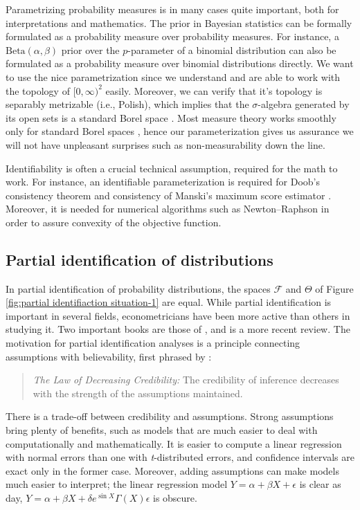 Parametrizing probability measures is in many cases quite important, both for interpretations and mathematics. The prior in Bayesian statistics can be formally formulated as a probability measure over probability measures. For instance, a $\textrm{Beta}(\alpha,\beta)$ prior over the $p$-parameter of a binomial distribution can also be formulated as a probability measure over binomial distributions directly. We want to use the nice parametrization since we understand and are able to work with the topology of $[0,\infty)^2$ easily. Moreover, we can verify that it's topology is separably metrizable (i.e., Polish), which implies that the $\sigma$-algebra generated by its open sets is a standard Borel space \parencite{Kechris2012-nh}. Most measure theory works smoothly only for standard Borel spaces \parencite[][Chapter 1]{Van_der_Vaart1996-dx}, hence our parameterization gives us assurance we will not have unpleasant surprises such as non-measurability down the line. 

Identifiability is often a crucial technical assumption, required for the math to work. For instance, an identifiable parameterization is required for Doob's consistency theorem \parencite{Miller2018-xq} and consistency of Manski's maximum score estimator \parencite{Manski1975-gl}. Moreover, it is needed for numerical algorithms such as Newton--Raphson in order to assure convexity of the objective function.

\subsection{Partial identification of distributions}
In partial identification of probability distributions, the spaces $\mathcal{F}$ and $\Theta$ of Figure \ref{fig:partial identifiaction situation-1} are equal. While partial identification is important in several fields, econometricians have been more active than others in studying it. Two important books are those of \textcite{Manski1999-ab,Manski2003-aq}, and \textcite{Tamer2010-rj} is a more recent review. The motivation for partial identification analyses is a principle connecting assumptions with believability, first phrased by \textcite[p. 1]{Manski2003-aq}:
\begin{quote}
\emph{The Law of Decreasing Credibility: }The credibility of inference
decreases with the strength of the assumptions maintained.
\end{quote}
There is a trade-off between credibility and assumptions. Strong assumptions bring plenty of benefits, such as models that are much easier to deal with computationally and mathematically. It is easier to compute a linear regression with normal errors than one with \emph{t}-distributed errors, and confidence intervals are exact only in the former case. Moreover, adding assumptions can make models much easier to interpret; the linear regression model $Y=\alpha+\beta X+\epsilon$ is clear as day, $Y=\alpha+\beta X+\delta e^{\sin X}\Gamma(X)\epsilon$ is obscure. 

